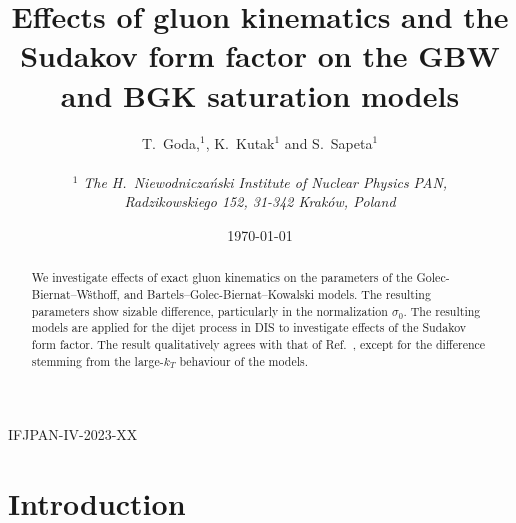 \documentclass[11pt]{article}
\author{
T.~Goda,$^1$, K.~Kutak$^{1}$ and S.~Sapeta$^1$\\\,\\
$^1$ 
{\small\it The H.\ Niewodnicza\'nski Institute of Nuclear Physics PAN,}\\ 
{\small\it Radzikowskiego 152, 31-342 Krak\'ow, Poland}\\%
}
\title{Effects of gluon kinematics and the Sudakov form factor on the GBW and BGK saturation models}
\date{\today}
\numberwithin{equation}{section}
\numberwithin{table}{section}
\numberwithin{figure}{section}
\begin{document}
\maketitle

\vspace{-25em}
\begin{flushright}
  IFJPAN-IV-2023-XX\\
\end{flushright}
\vspace{20em}

\begin{abstract}
We investigate effects of exact gluon kinematics on the parameters of the
Golec-Biernat--W\"sthoff, and Bartels--Golec-Biernat--Kowalski models. The
resulting parameters show sizable difference, particularly in the normalization
$\sigma_0$. The resulting models are applied for the dijet process in DIS to
investigate effects of the Sudakov form factor.  The result qualitatively agrees
with that of Ref.~\cite{vanHameren:2021sqc}, except for the difference stemming
from the large-$k_T$ behaviour of the models.
\end{abstract}

\section{Introduction}
\end{document}
